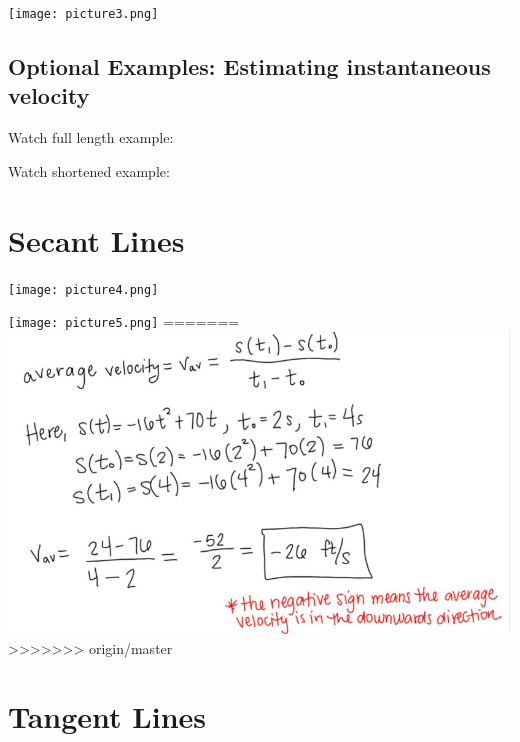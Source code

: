 \documentclass{ximera}
\begin{document}
\begin{image}
\texttt{[image: picture3.png]}
\end{image}


\subsection{Optional Examples: Estimating instantaneous velocity}

Watch full length example:
\begin{foldable}
\end{foldable}

Watch shortened example: 
\begin{foldable}
\end{foldable}


\section{Secant Lines}

\begin{image}
\texttt{[image: picture4.png]}
\end{image}


\begin{image}
\texttt{[image: picture5.png]}
=======
\includegraphics{picture2.jpg}
>>>>>>> origin/master
\end{image}

\section{Tangent Lines}
\end{document}
